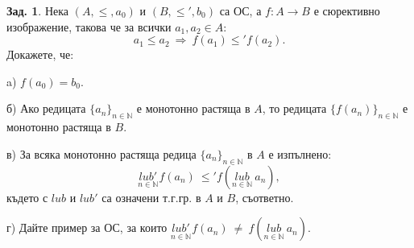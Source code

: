 \documentclass[a4paper,9pt]{extarticle}
\theoremstyle{definition}
\newtheorem{problem}{Зад.}
\newcommand{\Nat}{\mathbb{N}}
\begin{document}
\newpage

\begin{problem} Нека $(A, \leqslant, a_0)$ и $(B, \leqslant', b_0)$  са ОС, а $f\!: A \rightarrow B$ е сюрективно изображение, такова че за всички $a_1, a_2\in A$:
$$a_1\leqslant a_2\ \Longrightarrow\ f(a_1)\leqslant'f(a_2).$$
Докажете, че:

\vskip1pt

a) $f(a_0) = b_0$.

\vskip2pt


б) Ако редицата $\{a_n\}_{n \in \Nat}$  е монотонно растяща в $A$, то редицата $\{f(a_n)\}_{n \in \Nat}$ е монотонно растяща в $B$.

\vskip2pt

в) За всяка монотонно растяща  редица $\{a_n\}_{n \in \Nat}$ в $A$  е изпълнено:
$$\underset{n \in \Nat}{lub'}\hspace{1pt} f(a_n)\ \leqslant'f( \underset{n \in \Nat}{lub}\ a_n),$$
където с  $lub$ и $lub'$ са означени т.г.гр. в $A$ и $B$, съответно.

\vskip2pt

г) Дайте пример за ОС, за които $\underset{n \in \Nat}{lub'}\hspace{1pt} f(a_n)\  \neq \ f( \underset{n \in \Nat}{lub}\ a_n)$.

\end{problem} 

\vskip7pt 
\end{document}
